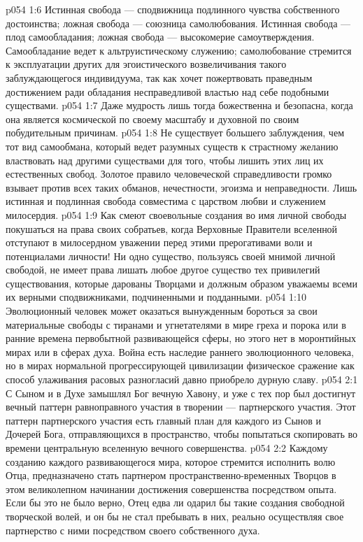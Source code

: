 \vs p054 1:6 Истинная свобода --- сподвижница подлинного чувства собственного достоинства; ложная свобода --- союзница самолюбования. Истинная свобода --- плод самообладания; ложная свобода --- высокомерие самоутверждения. Самообладание ведет к альтруистическому служению; самолюбование стремится к эксплуатации других для эгоистического возвеличивания такого заблуждающегося индивидуума, так как хочет пожертвовать праведным достижением ради обладания несправедливой властью над себе подобными существами.
\vs p054 1:7 \pc Даже мудрость лишь тогда божественна и безопасна, когда она является космической по своему масштабу и духовной по своим побудительным причинам.
\vs p054 1:8 \pc Не существует большего заблуждения, чем тот вид самообмана, который ведет разумных существ к страстному желанию властвовать над другими существами для того, чтобы лишить этих лиц их естественных свобод. Золотое правило человеческой справедливости громко взывает против всех таких обманов, нечестности, эгоизма и неправедности. Лишь истинная и подлинная свобода совместима с царством любви и служением милосердия.
\vs p054 1:9 Как смеют своевольные создания во имя личной свободы покушаться на права своих собратьев, когда Верховные Правители вселенной отступают в милосердном уважении перед этими прерогативами воли и потенциалами личности! Ни одно существо, пользуясь своей мнимой личной свободой, не имеет права лишать любое другое существо тех привилегий существования, которые дарованы Творцами и должным образом уважаемы всеми их верными сподвижниками, подчиненными и подданными.
\vs p054 1:10 Эволюционный человек может оказаться вынужденным бороться за свои материальные свободы с тиранами и угнетателями в мире греха и порока или в ранние времена первобытной развивающейся сферы, но этого нет в моронтийных мирах или в сферах духа. Война есть наследие раннего эволюционного человека, но в мирах нормальной прогрессирующей цивилизации физическое сражение как способ улаживания расовых разногласий давно приобрело дурную славу.
\vs p054 2:1 С Сыном и в Духе замышлял Бог вечную Хавону, и уже с тех пор был достигнут вечный паттерн равноправного участия в творении --- партнерского участия. Этот паттерн партнерского участия есть главный план для каждого из Сынов и Дочерей Бога, отправляющихся в пространство, чтобы попытаться скопировать во времени центральную вселенную вечного совершенства.
\vs p054 2:2 Каждому созданию каждого развивающегося мира, которое стремится исполнить волю Отца, предназначено стать партнером пространственно\hyp{}временных Творцов в этом великолепном начинании достижения совершенства посредством опыта. Если бы это не было верно, Отец едва ли одарил бы такие создания свободной творческой волей, и он бы не стал пребывать в них, реально осуществляя свое партнерство с ними посредством своего собственного духа.
